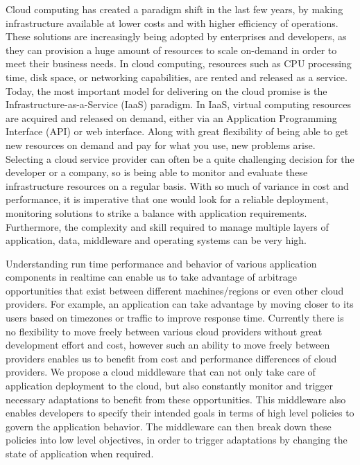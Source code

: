\documentclass{seal_thesis}
\begin{document}
Cloud computing has created a paradigm shift in the last few years, by making infrastructure available at lower costs and with higher efficiency of operations.
These solutions are increasingly being adopted by enterprises and developers, as they can provision a huge amount of resources to scale on-demand in order to meet their business needs.
In cloud computing, resources such as CPU processing time, disk space, or networking capabilities, are rented and released as a service.
Today, the most important model for delivering on the cloud promise is the Infrastructure-as-a-Service (IaaS) paradigm.
In IaaS, virtual computing resources are acquired and released on demand, either via an Application Programming Interface (API) or web interface.
Along with great flexibility of being able to get new resources on demand and pay for what you use, new problems arise.
Selecting a cloud service provider can often be a quite challenging decision for the developer or a company, so is being able to monitor and evaluate these infrastructure resources on a regular basis.
With so much of variance in cost and performance, it is imperative that one would look for a reliable deployment, monitoring solutions to strike a balance with application requirements.
Furthermore, the complexity and skill required to manage multiple layers of application, data, middleware and operating systems can be very high.

Understanding run time performance and behavior of various application components in realtime can enable us to take advantage of arbitrage opportunities that exist between different machines/regions or even other cloud providers.
For example, an application can take advantage by moving closer to its users based on timezones or traffic to improve response time.
Currently there is no flexibility to move freely between various cloud providers without great development effort and cost, however such an ability to move freely between providers enables us to benefit from cost and performance differences of cloud providers.
We propose a cloud middleware that can not only take care of application deployment to the cloud, but also constantly monitor and trigger necessary adaptations to benefit from these opportunities.
This middleware also enables developers to specify their intended goals in terms of high level policies to govern the application behavior.
The middleware can then break down these policies into low level objectives, in order to trigger adaptations by changing the state of application when required.
\end{document}
